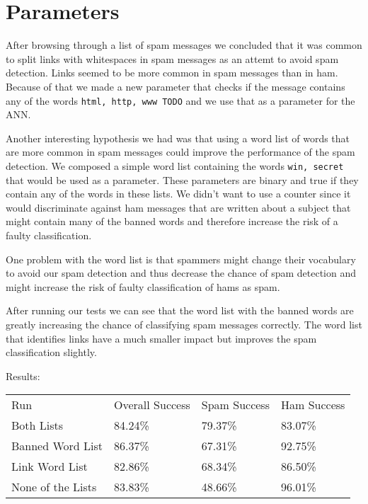 \section{Parameters}
After browsing through a list of spam messages we concluded that it was common to split links with whitespaces in spam messages as an attemt to avoid spam detection. Links seemed to be more common in spam messages than in ham. Because of that we made a new parameter that checks if the message contains any of the words \texttt{html, http, www TODO} and we use that as a parameter for the ANN. 

Another interesting hypothesis we had was that using a word list of words that are more common in spam messages could improve the performance of the spam detection. We composed a simple word list containing the words \texttt{win, secret} that would be used as a parameter.
These parameters are binary and true if they contain any of the words in these lists. We didn't want to use a counter since it would discriminate against ham messages that are written about a subject that might contain many of the banned words and therefore increase the risk of a faulty classification. 

One problem with the word list is that spammers might change their vocabulary to avoid our spam detection and thus decrease the chance of spam detection and might increase the risk of faulty classification of hams as spam. 

After running our tests we can see that the word list with the banned words are greatly increasing the chance of classifying spam messages correctly. The word list that identifies links have a much smaller impact but improves the spam classification slightly. 

Results:
\begin{table}[h]
\begin{tabular}{llll}
Run               & Overall Success & Spam Success & Ham Success \\
Both Lists        & 84.24\%         & 79.37\%      & 83.07\%     \\
Banned Word List  & 86.37\%         & 67.31\%      & 92.75\%     \\
Link Word List    & 82.86\%         & 68.34\%      & 86.50\%     \\
None of the Lists & 83.83\%         & 48.66\%      & 96.01\%    
\end{tabular}
\end{table}